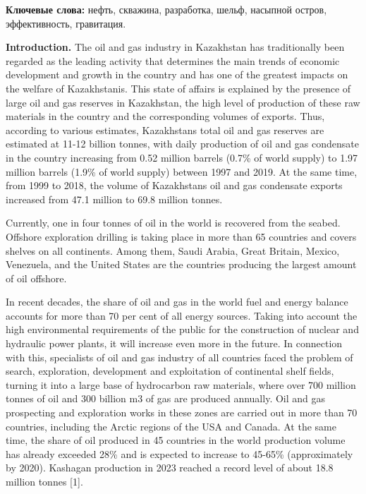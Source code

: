 {\bfseries Ключевые слова:} нефть, скважина, разработка, шельф, насыпной
остров, эффективность, гравитация.

\begin{multicols}{2}
{\bfseries Introduction.} The oil and gas industry in Kazakhstan has
traditionally been regarded as the leading activity that determines the
main trends of economic development and growth in the country and has
one of the greatest impacts on the welfare of Kazakhstanis. This state
of affairs is explained by the presence of large oil and gas reserves in
Kazakhstan, the high level of production of these raw materials in the
country and the corresponding volumes of exports. Thus, according to
various estimates, Kazakhstan\textquotesingle s total oil and gas
reserves are estimated at 11-12 billion tonnes, with daily production of
oil and gas condensate in the country increasing from 0.52 million
barrels (0.7\% of world supply) to 1.97 million barrels (1.9\% of world
supply) between 1997 and 2019. At the same time, from 1999 to 2018, the
volume of Kazakhstan\textquotesingle s oil and gas condensate exports
increased from 47.1 million to 69.8 million tonnes.

Currently, one in four tonnes of oil in the world is recovered from the
seabed. Offshore exploration drilling is taking place in more than 65
countries and covers shelves on all continents. Among them, Saudi
Arabia, Great Britain, Mexico, Venezuela, and the United States are the
countries producing the largest amount of oil offshore.

In recent decades, the share of oil and gas in the world fuel and energy
balance accounts for more than 70 per cent of all energy sources. Taking
into account the high environmental requirements of the public for the
construction of nuclear and hydraulic power plants, it will increase
even more in the future. In connection with this, specialists of oil and
gas industry of all countries faced the problem of search, exploration,
development and exploitation of continental shelf fields, turning it
into a large base of hydrocarbon raw materials, where over 700 million
tonnes of oil and 300 billion m3 of gas are produced annually. Oil and
gas prospecting and exploration works in these zones are carried out in
more than 70 countries, including the Arctic regions of the USA and
Canada. At the same time, the share of oil produced in 45 countries in
the world production volume has already exceeded 28\% and is expected to
increase to 45-65\% (approximately by 2020). Kashagan production in 2023
reached a record level of about 18.8 million tonnes {[}1{]}.


\end{multicols}
